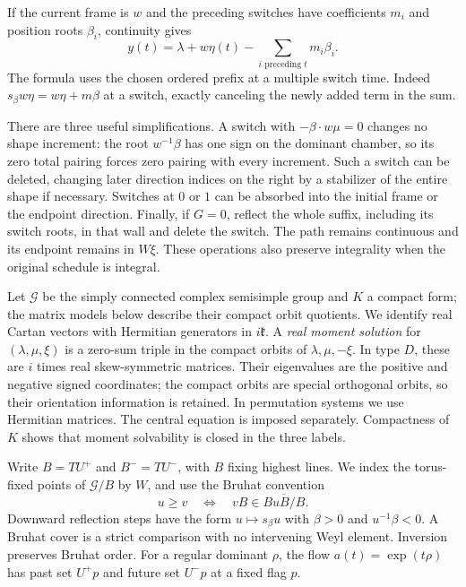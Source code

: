 If the current frame is $w$ and the preceding switches have coefficients
$m_i$ and position roots $\beta_i$, continuity gives
\begin{equation}\label{real:balance}
 y(t)=\lambda+w\eta(t)-\sum_{i\text{ preceding }t}m_i\beta_i.
\end{equation}
The formula uses the chosen ordered prefix at a multiple switch time.
Indeed $s_\beta w\eta=w\eta+m\beta$ at a switch, exactly canceling
the newly added term in the sum.

There are three useful simplifications.  A switch with
$-\beta\cdot w\mu=0$ changes no shape increment: the root
$w^{-1}\beta$ has one sign on the dominant chamber, so its zero total
pairing forces zero pairing with every increment.  Such a switch can
be deleted, changing later direction indices on the right by a
stabilizer of the entire shape if necessary.  Switches at $0$ or $1$
can be absorbed into the initial frame or the endpoint direction.
Finally, if $G=0$, reflect the whole suffix, including its switch
roots, in that wall and delete the switch.  The path remains continuous
and its endpoint remains in $W\xi$.  These operations also preserve
integrality when the original schedule is integral.

Let $\mathcal G$ be the simply connected complex semisimple group
and $K$ a compact form; the matrix models below describe their compact
orbit quotients.  We identify real Cartan vectors with Hermitian generators in
$i\mathfrak k$.  A \emph{real moment solution} for
$(\lambda,\mu,\xi)$ is a zero-sum triple in the compact orbits of
$\lambda,\mu,-\xi$.  In type $D$, these are $i$ times real
skew-symmetric matrices.  Their eigenvalues are the positive and
negative signed coordinates; the compact orbits are special
orthogonal orbits, so their orientation information is retained.  In
permutation systems we use Hermitian matrices.  The central equation
is imposed separately.  Compactness of $K$ shows that moment
solvability is closed in the three labels.

Write $B=T U^+$ and $B^-=T U^-$, with $B$ fixing highest lines.
We index the torus-fixed points of $\mathcal G/B$ by $W$, and use the
Bruhat convention
\[
 u\ge v\quad\Longleftrightarrow\quad
 vB\in\overline{BuB/B}.
\]
Downward reflection steps have the form $u\mapsto s_\beta u$ with
$\beta>0$ and $u^{-1}\beta<0$.  A Bruhat cover is a strict
comparison with no intervening Weyl element.  Inversion preserves
Bruhat order.
For a regular dominant $\rho$, the flow
$a(t)=\exp(t\rho)$ has past set $U^+p$ and future set $U^-p$ at a
fixed flag $p$.

